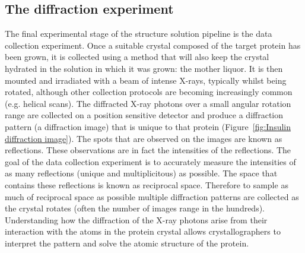     \subsection{The diffraction experiment}
    \label{sub:The diffraction experiment}
        The final experimental stage of the structure solution pipeline is the data collection experiment.
        Once a suitable crystal composed of the target protein has been grown, it is collected using a method that will also keep the crystal hydrated in the solution in which it was grown: the mother liquor.
        It is then mounted and irradiated with a beam of intense X-rays, typically whilst being rotated, although other collection protocols are becoming increasingly common (e.g. helical scans).
        The diffracted X-ray photons over a small angular rotation range are collected on a position sensitive detector and produce a diffraction pattern (a diffraction image) that is unique to that protein (Figure~\ref{fig:Insulin diffraction image}).
        The spots that are observed on the images are known as reflections. These observations are in fact the intensities of the reflections.
        The goal of the data collection experiment is to accurately measure the intensities of as many reflections (unique and multiplicitous) as possible.
        The space that contains these reflections is known as reciprocal space.
        Therefore to sample as much of reciprocal space as possible multiple diffraction patterns are collected as the crystal rotates (often the number of images range in the hundreds).
        Understanding how the diffraction of the X-ray photons arise from their interaction with the atoms in the protein crystal allows crystallographers to interpret the pattern and solve the atomic structure of the protein.
